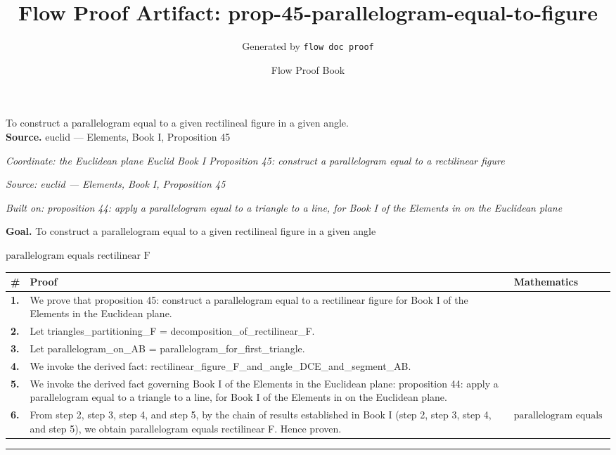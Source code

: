 \documentclass[11pt]{article}
\title{Flow Proof Artifact: prop-45-parallelogram-equal-to-figure}
\author{Generated by \texttt{flow doc proof}}
\date{Flow Proof Book}
\theoremstyle{definition}
\begin{document}
\maketitle
To construct a parallelogram equal to a given rectilineal figure in a given angle.\\[0.5em]
\textbf{Source.} euclid — Elements, Book I, Proposition 45\\[0.5em]
\bigskip
{}\par
\smallskip\noindent\textit{Coordinate: the Euclidean plane \cdot Euclid Book I \cdot Proposition 45: construct a parallelogram equal to a rectilinear figure}\par
\smallskip\noindent\textit{Source: euclid — Elements, Book I, Proposition 45}\par
\smallskip\noindent\textit{Built on: proposition 44: apply a parallelogram equal to a triangle to a line, for Book I of the Elements in on the Euclidean plane}\par
\medskip
\noindent\textbf{Goal.} To construct a parallelogram equal to a given rectilineal figure in a given angle\par
\noindent$\displaystyle \text{parallelogram equals rectilinear F}$\par
\medskip
\noindent
\begin{tabular}{@{} >{\raggedright\arraybackslash}p{} >{\raggedright\arraybackslash}p{} >{\raggedleft\arraybackslash}p{} @{}}
\textbf{\#} & \textbf{Proof} & \textbf{Mathematics} \\
\midrule
\textbf{1.} & We prove that proposition 45: construct a parallelogram equal to a rectilinear figure for Book I of the Elements in the Euclidean plane. & \\[0.45em]
\textbf{2.} & Let triangles\_partitioning\_F = decomposition\_of\_rectilinear\_F. & \\[0.45em]
\textbf{3.} & Let parallelogram\_on\_AB = parallelogram\_for\_first\_triangle. & \\[0.45em]
\textbf{4.} & We invoke the derived fact: rectilinear\_figure\_F\_and\_angle\_DCE\_and\_segment\_AB. & \\[0.45em]
\textbf{5.} & We invoke the derived fact governing Book I of the Elements in the Euclidean plane: proposition 44: apply a parallelogram equal to a triangle to a line, for Book I of the Elements in on the Euclidean plane. & \\[0.45em]
\textbf{6.} & From step 2, step 3, step 4, and step 5, by the chain of results established in Book I (step 2, step 3, step 4, and step 5), we obtain parallelogram equals rectilinear F. Hence proven. & $\displaystyle \text{parallelogram equals rectilinear F}$ \\[0.45em]
\bottomrule
\end{tabular}
\label{thm:Geometry-Euclid Book I-proposition_45_construct_a_parallelogram_equal_to_a_rectilinear_figure}
\par\medskip\hrule
\end{document}
